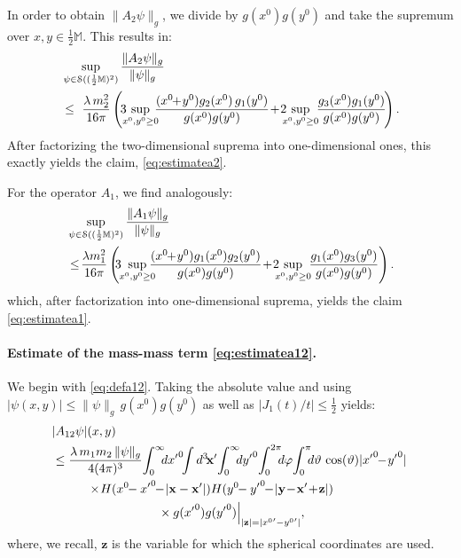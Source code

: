\documentclass[b5paper,draft,openbib,12pt]{memoir}
\newcommand{\M}{\mathbb{M}}
\newcommand{\vx}{\mathbf{x}}
\newcommand{\vy}{\mathbf{y}}
\newcommand{\vz}{\mathbf{z}}
\begin{document}
In order to obtain $\| A_2 \psi \|_g$, we divide by 
$g(x^0)g(y^0)$ and take 
the supremum over $x,y \in \tfrac{1}{2}\M$. This results in:
\begin{align}
  &\sup_{\psi \in \mathcal{S}((\frac{1}{2}\M)^2)} \frac{\| A_2 \psi \|_g}{\| \psi \|_g} \\
  &\leq~ \frac{\lambda \, m_2^2}{16\pi} \left( \!3\!\!\!\sup_{x^0,y^0 \geq 0}\!\!\! \frac{(x^0\!\!+\!y^0)g_2(x^0)\, g_1(y^0)}{g(x^0)g(y^0)}  \!+\! 2\!\!\! \sup_{x^0,y^0\geq 0}\!\! \frac{g_3(x^0)g_1(y^0)}{g(x^0)g(y^0)}\!\right).\notag
\end{align}
After factorizing the two-dimensional suprema 
into one-dimensional ones, 
this exactly yields the claim, \eqref{eq:estimatea2}.

For the operator $A_1$, we find analogously:
\begin{align}
  &\sup_{\psi \in \mathcal{S}((\frac{1}{2}\M)^2)} \frac{\| A_1 \psi \|_g}{\| \psi \|_g} \notag\\
  &\leq\! \frac{\lambda m_1^2}{16\pi} \left(\!\! 3\!\!\sup_{x^0,y^0 \geq 0}\!\!\!\! \frac{(x^0\!\!+\!y^0)g_1(x^0) g_2(y^0)}{g(x^0)g(y^0)}  
  \!+\! 2\!\!\! \sup_{x^0,y^0\geq 0}\!\! \frac{g_1(x^0)g_3(y^0)}{g(x^0)g(y^0)}\right).
\end{align}
which, after factorization into one-dimensional suprema, yields 
the claim 
\eqref{eq:estimatea1}.


\paragraph{Estimate of the mass-mass term \eqref{eq:estimatea12}.} 
\label{sec:estimatemassmass}

We begin with \eqref{eq:defa12}. Taking the absolute value and using 
$|\psi(x,y)| \leq \| \psi \|_g \, g(x^0) g(y^0)$ as well as 
$|J_1(t)/t|\leq \frac{1}{2}$ yields:
\begin{align}
&|A_{12} \psi|(x,y) \notag\\
&\leq \frac{\lambda \, m_1 m_2 \, \| \psi \|_g}{4(4\pi)^3}\!  \int_0^\infty\!\!\! d{x'}^0\!\! \int d^3 \!\vx' \!\int_0^\infty \!\!\!d{y'}^0 \!\int_0^{2\pi}\!\!\! d\varphi \!\int_{0}^{\pi} \!\!\!d \vartheta \, \cos(\vartheta) |{x'}^0\!\!-\!{y'}^0| \,  \nonumber\\
&\hspace{1cm}\times\! H(x^0\!\!-{x'}^0\!\!-\!|\vx-\vx'|)H(y^0\!\!-{y'}^0\!\!-\!|\vy\!-\!\vx'\!+\!\vz|)\notag\\
&\hspace{3cm} \times g({x'}^0)g({y'}^0)\Big|_{|\vz| = |{x^0}'-{y^0}'|},
\end{align}
where, we recall, $\vz$ is the variable for which the spherical 
coordinates are used.
\end{document}
